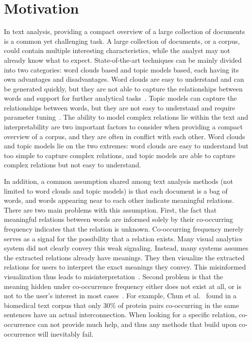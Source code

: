 \section{Motivation}
% 
In text analysis, providing a compact overview of a large collection of documents is a common yet challenging task.
A large collection of documents, or a corpus, could contain multiple interesting characteristics, while the analyst may not already know what to expect.
State-of-the-art techniques can be mainly divided into two categories: word clouds based and topic models based, each having its own advantages and disadvantages.
Word clouds are easy to understand and can be generated quickly, but they are not able to capture the relationships between words and support for further analytical tasks~\cite{viegas2008timelines}.
Topic models can capture the relationships between words, but they are not easy to understand and require parameter tuning~\cite{chuang2013topicdiagnostic}.
The ability to model complex relations lie within the text and interpretability are two important factors to consider when providing a compact overview of a corpus, and they are often in conflict with each other.
Word clouds and topic models lie on the two extremes: word clouds are easy to understand but too simple to capture complex relations, and topic models are able to capture complex relations but not easy to understand.

In addition, a common assumption shared among text analysis methods (not limited to word clouds and topic models) is that each document is a bag of words, and words appearing near to each other indicate meaningful relations.
There are two main problems with this assumption.
First, the fact that meaningful relations between words are informed solely by their co-occurring frequency indicates that the relation is unknown.
Co-occurring frequency merely serves as a signal for the possibility that a relation exists.
Many visual analytics system did not clearly convey this weak signaling. 
Instead, many systems assumes the extracted relations already have meanings.
They then visualize the extracted relations for users to interpret the exact meanings they convey.
This misinformed visualization thus leads to misinterpretation~\cite{lee2017human}.
Second problem is that the meaning hidden under co-occurrence frequency either does not exist at all, or is not to the user's interest in most cases~\cite{EESurveyBiomed}.
For example, Chun et al.~\cite{chun2006extraction} found in a biomedical text corpus that only 30\% of protein pairs co-occurring in the same sentences have an actual interconnection.
When looking for a specific relation, co-occurrence can not provide much help, and thus any methods that build upon co-occurrence will inevitably fail.

